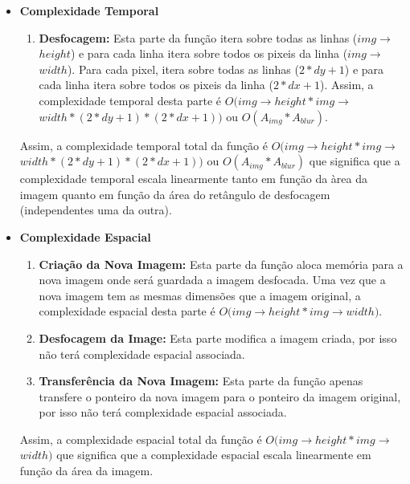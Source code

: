 \begin{itemize}

\item
\textbf{Complexidade Temporal}

\begin{enumerate}
    \item \textbf{Desfocagem:} Esta parte da função itera sobre todas as linhas ($img$$\rightarrow$$height$) e para cada linha itera sobre todos os pixeis da linha ($img$$\rightarrow$$width$). Para cada pixel, itera sobre todas as linhas ($2 * dy + 1$) e para cada linha itera sobre todos os pixeis da linha ($2 * dx + 1$). Assim, a complexidade temporal desta parte é $O(img$$\rightarrow$$height * img$$\rightarrow$$width * (2 * dy + 1) * (2 * dx + 1))$ ou $O(A_{img}*A_{blur})$.
\end{enumerate}

Assim, a complexidade temporal total da função é $O(img$$\rightarrow$$height * img$$\rightarrow$$width * (2 * dy + 1) * (2 * dx + 1))$ ou $O(A_{img}*A_{blur})$ que significa que a complexidade temporal escala linearmente tanto em função da àrea da imagem quanto em função da área do retângulo de desfocagem (independentes uma da outra).

\item

\textbf{Complexidade Espacial}

\begin{enumerate}
    \item \textbf{Criação da Nova Imagem:} Esta parte da função aloca memória para a nova imagem onde será guardada a imagem desfocada. Uma vez que a nova imagem tem as mesmas dimensões que a imagem original, a complexidade espacial desta parte é $O(img$$\rightarrow$$height * img$$\rightarrow$$width)$.
    \item \textbf{Desfocagem da Image:} Esta parte modifica a imagem criada, por isso não terá complexidade espacial associada.
    \item \textbf{Transferência da Nova Imagem:} Esta parte da função apenas transfere o ponteiro da nova imagem para o ponteiro da imagem original, por isso não terá complexidade espacial associada.
\end{enumerate}

Assim, a complexidade espacial total da função é $O(img$$\rightarrow$$height * img$$\rightarrow$$width)$ que significa que a complexidade espacial escala linearmente em função da área da imagem.

\end{itemize}

